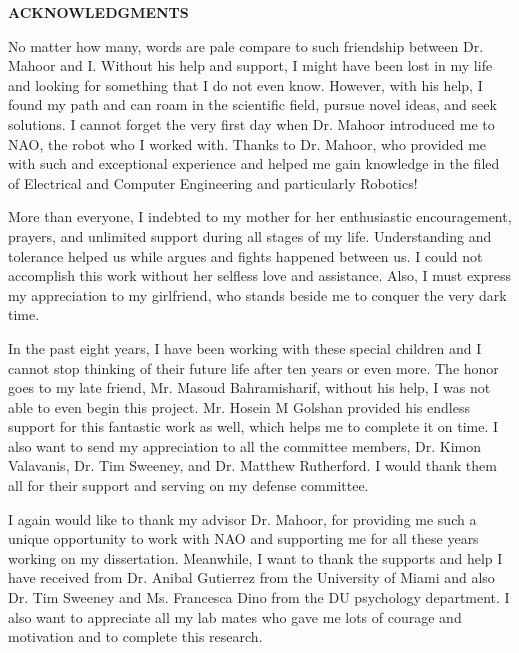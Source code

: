 \newpage
\begin{center}
{\Large \textbf{ACKNOWLEDGMENTS}}
\end{center}
\vspace{10mm}

No matter how many, words are pale compare to such friendship between Dr. Mahoor and I. Without his help and support, I might have been lost in my life and looking for something that I do not even know. However, with his help, I found my path and can roam in the scientific field, pursue novel ideas, and seek solutions. I cannot forget the very first day when Dr. Mahoor introduced me to NAO, the robot who I worked with. Thanks to Dr. Mahoor, who provided me with such and exceptional experience and helped me gain knowledge in the filed of Electrical and Computer Engineering and particularly Robotics!

\vspace{3mm}

More than everyone, I indebted to my mother for her enthusiastic encouragement, prayers, and unlimited support during all stages of my life. Understanding and tolerance helped us while argues and fights happened between us. I could not accomplish this work without her selfless love and assistance. Also, I must express my appreciation to my girlfriend, who stands beside me to conquer the very dark time.

\vspace{3mm}

In the past eight years, I have been working with these special children and I cannot stop thinking of their future life after ten years or even more. The honor goes to my late friend, Mr. Masoud Bahramisharif, without his help, I was not able to even begin this project. Mr. Hosein M Golshan provided his endless support for this fantastic work as well, which helps me to complete it on time. I also want to send my appreciation to all the committee members, Dr. Kimon Valavanis, Dr. Tim Sweeney, and Dr. Matthew Rutherford. I would thank them all for their support and serving on my defense committee.

\vspace{3mm}

I again would like to thank my advisor Dr. Mahoor, for providing me such a unique opportunity to work with NAO and supporting me for all these years working on my dissertation. Meanwhile, I want to thank the supports and help I have received from Dr. Anibal Gutierrez from the University of Miami and also Dr. Tim Sweeney and Ms. Francesca Dino from the DU psychology department. I also want to appreciate all my lab mates who gave me lots of courage and motivation and to complete this research.

